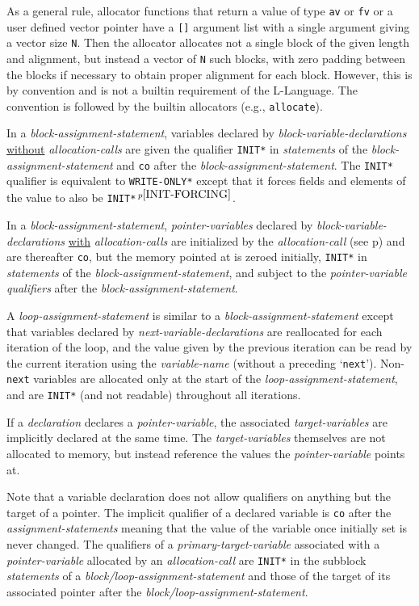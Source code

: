 \documentclass[12pt]{article}
\newcommand{\pagref}[1]{p\pageref{#1}}
\newcommand{\pagnote}[1]{$\,^{p\pageref{#1}}$}
\newcommand{\EOL}{\penalty \exhyphenpenalty}
\begin{document}
As a general rule, allocator functions that return a value of
type {\tt av} or {\tt fv} or a user defined vector pointer
have a {\tt []} argument list
with a single argument giving a vector size {\tt N}.
Then the allocator allocates not a single block of the given length
and alignment, but instead a vector of {\tt N} such blocks, with zero padding
between the blocks if necessary to obtain proper alignment for each
block.  However,
this is by convention and is not a builtin requirement of the L-Language.
The convention is followed by the builtin allocators (e.g., {\tt allocate}).

In a {\em block-assignment-statement},
variables declared by {\em block-variable-declarations}
\underline{without} {\em allocation-calls}
are given the qualifier {\tt *INIT*} in {\em statements}
of the {\em block-assignment-statement} and {\tt co} after the
{\em block-assignment-statement}.
The {\tt *INIT*} qualifier is equivalent to {\tt *WRITE-\EOL ONLY*}
except that it forces fields and elements of the value to also
be {\tt *INIT*}\pagnote{INIT-FORCING}.

In a {\em block-assignment-statement},
{\em pointer-variables} declared by {\em block-variable-declarations}
\underline{with} {\em allocation-calls}
are initialized by the {\em allocation-call}
(see \pagref{ALLOCATION-CALLS}) and are thereafter
{\tt co}, but the memory
pointed at is zeroed initially,
{\tt *INIT*} in {\em statements}
of the {\em block-assignment-statement}, and
subject to the {\em pointer-variable} {\em qualifiers} after
the {\em block-assignment-statement}.

A {\em loop-assignment-statement} is similar to a
{\em block-assignment-statement} except that variables declared
by {\em next-variable-declarations} are reallocated for each iteration
of the loop, and the value given by the previous iteration can be
read by the current iteration using the {\em variable-name}
(without a preceding `{\tt next}').
Non-{\tt next} variables are allocated only at the start of the
{\em loop-assignment-statement}, and are {\tt *INIT*} (and not readable)
throughout all iterations.

If a {\em declaration} declares a {\em pointer-variable},
the associated {\em target-variables} are implicitly declared at the same time.
The {\em target-variables} themselves are not allocated to memory,
but instead reference the values the {\em pointer-variable}
points at.

Note that a variable declaration does not allow
qualifiers on anything but the target of a pointer.  The implicit
qualifier of a declared variable is {\tt co} after the
{\em assignment-statements} meaning that
the value of the variable once initially set is never changed.
The qualifiers of a {\em primary-target-variable} associated with a
{\em pointer-variable} allocated by an {\em allocation-call}
are {\tt *INIT*} in the subblock {\em statements}
of a {\em block/loop-assignment-statement} and those of the target of
its associated pointer after the
{\em block/loop-assignment-statement}.
\end{document}
